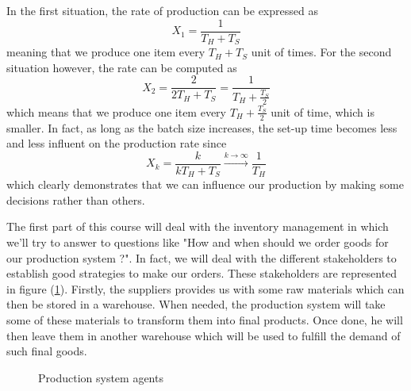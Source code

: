 In the first situation, the rate of production can be expressed as \[ X_1 = \frac{1}{T_H + T_S} \] meaning that we produce one item every $T_H+T_S$ unit of times. For the second situation however, the rate can be computed as \[ X_2 = \frac{2}{2T_H + T_S} = \frac{1}{T_H + \frac{T_S}{2}} \] which means that we produce one item every $T_H+\frac{T_S}{2}$ unit of time, which is smaller. In fact, as long as the batch size increases, the set-up time becomes less and less influent on the production rate since \[ X_k = \frac{k}{kT_H+T_S}\overset{k\rightarrow\infty}{\longrightarrow} \frac{1}{T_H} \] which clearly demonstrates that we can influence our production by making some decisions rather than others. 

The first part of this course will deal with the inventory management in which we'll try to answer to questions like "How and when should we order goods for our production system ?". In fact, we will deal with the different stakeholders to establish good strategies to make our orders. These stakeholders are represented in figure (\ref{intro:agents}). Firstly, the suppliers provides us with some raw materials which can then be stored in a warehouse. When needed, the production system will take some of these materials to transform them into final products. Once done, he will then leave them in another warehouse which will be used to fulfill the demand of such final goods. 

\begin{figure}[h!]
    \centering
    \caption{\label{intro:agents}Production system agents}
\end{figure}

